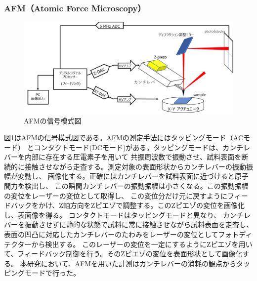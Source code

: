 \documentclass[dvipdfmx,12pt,a4paper]{jreport}
\begin{document}
		\subsubsection{AFM（Atomic Force Microscopy）}
		\begin{figure}[h]
			\centering
			\includegraphics[width=0.8\linewidth]{AFM.png}
			\caption{AFMの信号模式図}
			\label{stracture_of_AFM}
		\end{figure}
		図\ref{stracture_of_AFM}はAFMの信号模式図である。AFMの測定手法にはタッピングモード（ACモード）
		とコンタクトモード(DCモード)がある。タッピングモードは、カンチレバーを内部に存在する圧電素子を用いて
		共振周波数で振動させ、試料表面を断続的に接触させながら走査する。測定対象の表面形状からカンチレバーの振動振幅が変動し、
		画像化する。正確にはカンチレバーを試料表面に近づけると原子間力を検出し、
		この瞬間カンチレバーの振動振幅は小さくなる。この振動振幅の変位をレーザーの変位として取得し、
		この変位分だけ元に戻すようにフィードバックをかけ、Z軸方向をZピエゾで調整する。このZピエゾの変位を画像化し、表面像を得る。
		コンタクトモードはタッピングモードと異なり、
		カンチレバーを振動させずに静的な状態で試料に常に接触させながら試料表面を走査し、
		表面の凹凸に対応したカンチレバーのたわみをレーザーの変位としてフォトディテクターから検出する。
		このレーザーの変位を一定にするようにZピエゾを用いて、フィードバック制御を行う。そのZピエゾの変位を表面形状として画像化する。
		本研究において、AFMを用いた計測はカンチレバーの消耗の観点からタッピングモードで行った。
\end{document}
